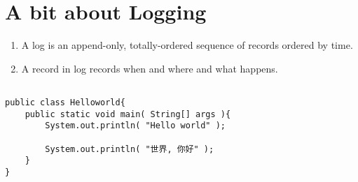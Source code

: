 \documentclass[UTF8]{ctexart}
\begin{document}
\section{A bit about Logging}

\begin{enumerate}
	\item A log is an append-only, totally-ordered sequence of records ordered by time.
	\item A record in log records when and where and what happens.
\end{enumerate}





\begin{verbatim}

public class Helloworld{
	public static void main( String[] args ){
		System.out.println( "Hello world" );
		
		System.out.println( "世界, 你好" );
	}
}
\end{verbatim}
\end{document}
